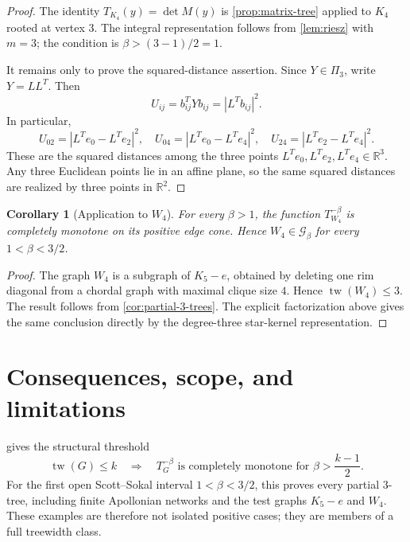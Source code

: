 \documentclass[preprint,12pt,authoryear]{elsarticle}
\numberwithin{equation}{section}
\newtheorem{corollary}[theorem]{Corollary}
\theoremstyle{definition}
\theoremstyle{remark}
\newcommand{\R}{\mathbb{R}}
\newcommand{\calG}{\mathcal{G}}
\newcommand{\1}{\mathbf{1}}
\newcommand{\tw}{\operatorname{tw}}
\begin{document}
\begin{proof}
The identity $T_{K_4}(y)=\det M(y)$ is \cref{prop:matrix-tree} applied to $K_4$ rooted at vertex $3$.  The integral representation follows from \cref{lem:riesz} with $m=3$; the condition is $\beta>(3-1)/2=1$.

It remains only to prove the squared-distance assertion.  Since $Y\in\Pi_3$, write $Y=LL^T$.  Then
\begin{equation}
        U_{ij}=b_{ij}^TYb_{ij}=|L^Tb_{ij}|^2.
\end{equation}
In particular,
\begin{equation}
        U_{02}=|L^Te_0-L^Te_2|^2,
        \quad
        U_{04}=|L^Te_0-L^Te_4|^2,
        \quad
        U_{24}=|L^Te_2-L^Te_4|^2.
\end{equation}
These are the squared distances among the three points $L^Te_0,L^Te_2,L^Te_4\in\R^3$.  Any three Euclidean points lie in an affine plane, so the same squared distances are realized by three points in $\R^2$.
\end{proof}

\begin{corollary}[Application to $W_4$]
\label{cor:w4}
For every $\beta>1$, the function $T_{W_4}^{-\beta}$ is completely monotone on its positive edge cone.  Hence $W_4\in\calG_\beta$ for every $1<\beta<3/2$.
\end{corollary}

\begin{proof}
The graph \(W_4\) is a subgraph of \(K_5-e\), obtained by deleting one rim diagonal from a chordal graph with maximal clique size \(4\).  Hence \(\tw(W_4)\le3\).  The result follows from \cref{cor:partial-3-trees}.  The explicit factorization above gives the same conclusion directly by the degree-three star-kernel representation.
\end{proof}

\section{Consequences, scope, and limitations}
\label{sec:conclusion}

 gives the structural threshold
\begin{equation}
        \tw(G)\le k
        \quad\Longrightarrow\quad
        T_G^{-\beta}\text{ is completely monotone for }
        \beta>\frac{k-1}{2}.
\end{equation}
For the first open Scott--Sokal interval \(1<\beta<3/2\), this proves every partial \(3\)-tree, including finite Apollonian networks and the test graphs \(K_5-e\) and \(W_4\).  These examples are therefore not isolated positive cases; they are members of a full treewidth class.
\end{document}
